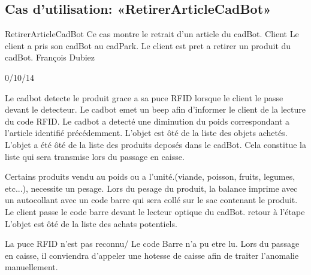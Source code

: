 \subsection{Cas d'utilisation: «RetirerArticleCadBot» }

\startCU
\nom RetirerArticleCadBot
\but Ce cas montre le retrait d'un article du cadBot.
\acteur Client
\precondition Le client a pris son cadBot au cadPark.
\declenchement Le client est pret a retirer un produit du cadBot.
\auteur François Dubiez
\date 30/10/14

\nominal %
\startnominal
\etape[SA1] Le cadbot detecte le produit grace a sa puce RFID lorsque le client le passe devant le detecteur. 
\etape[RETOUR] Le cadbot emet un beep afin d'informer le client de la lecture du code RFID.
\etape Le cadbot a detecté une diminution du poids correspondant a l'article identifié précédemment.
\etape L'objet est ôté de la liste des objets achetés.
\stopnominal
\postcondition L'objet a été ôté de la liste des produits deposés dans le cadBot. Cela constitue la liste qui sera transmise lors du passage en caisse.

\alternatifs %
\startalternatif[SA1] %
  \etape Certains produits vendu au poids ou a l'unité.(viande, poisson, fruits, legumes, etc...), necessite un pesage.
  \etape Lors du pesage du produit, la balance imprime avec un autocollant avec un code barre qui sera collé sur le sac contenant le produit.
  \etape Le client passe le code barre devant le lecteur optique du cadBot.
  \etape retour à l'étape \in[RETOUR]
\stopcondition
\postcondition L'objet est ôté de la liste des achats potentiels.
\stopalternatif


\exception %
La puce RFID n'est pas reconnu/ Le code Barre n'a pu etre lu.
Lors du passage en caisse, il conviendra d'appeler une hotesse de caisse afin de traiter l'anomalie manuellement.
\stopCU
